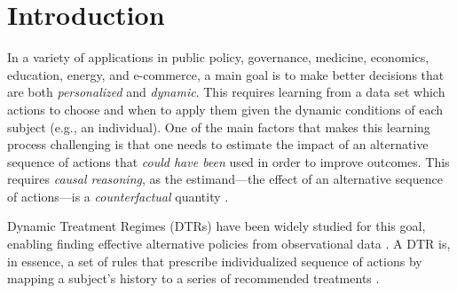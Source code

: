 \documentclass[opre,nonblindrev]{informs2}%
\newcommand{\1}{\hbox{\rm 1\kern-.35em 1}}
\begin{document}


\maketitle
\baselineskip=18pt
\vspace{-10mm}

\section{Introduction} \label{sec:intro}
In a variety of applications in public policy, governance, medicine, economics, education, energy, and e-commerce,   a main goal is to make better  decisions that are both {\em personalized} and {\em dynamic}. This requires learning from a data set which actions to choose  and when to apply them given the dynamic conditions of each subject (e.g., an individual). One of the main factors that makes this learning process challenging  is that one needs to  estimate the impact of an  alternative sequence of actions  that {\em could have been} used in order to improve outcomes. This requires {\em causal reasoning}, as the estimand---the effect of an alternative sequence of actions---is a {\em counterfactual} quantity \citep[see, e.g.,][]{Murphy2001, Murphy2003, Namkoong2020}.

Dynamic Treatment Regimes (DTRs) have been widely studied for this goal, enabling finding effective alternative policies from  observational data \citep{Robins1986, Robins1997, Murphy2001, Murphy2003, Robins2004, Zhao2015, Zhang2018, Wang2018, Tsiatis2019, Kosorok2019, Luckett2020, Nie2021, Leqi2021}. A DTR is, in essence, a set of rules that prescribe individualized sequence of actions by mapping a subject's history to a series of recommended treatments \citep{Murphy2003, Chakraborty2014, Tsiatis2019, Luckett2020, Xu2020}.
\end{document}

